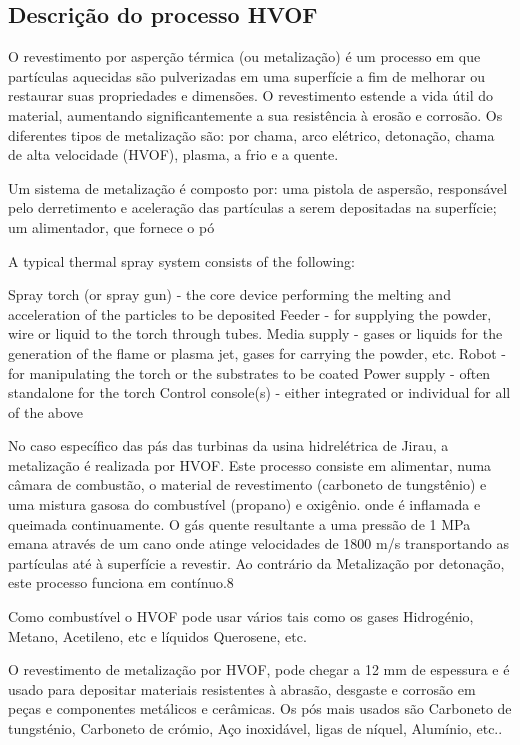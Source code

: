 \subsection{Descrição do processo HVOF}
O revestimento por asperção térmica (ou metalização) é um processo em que
partículas aquecidas são pulverizadas em uma superfície a fim de melhorar ou
restaurar suas propriedades e dimensões. O revestimento estende a vida útil do
material, aumentando significantemente a sua resistência à erosão e corrosão.
Os diferentes tipos de metalização são: por chama, arco elétrico, detonação,
chama de alta velocidade (HVOF), plasma, a frio e a quente.

Um sistema de metalização é composto por: uma pistola de aspersão, responsável
pelo derretimento e aceleração das partículas a serem depositadas na
superfície; um alimentador, que fornece o pó  

A typical thermal
spray system consists of the following:

Spray torch (or spray gun) - the core device performing the melting and
acceleration of the particles to be deposited 
Feeder - for supplying the
powder, wire or liquid to the torch through tubes.
Media supply - gases or liquids for the generation of the flame or plasma jet,
gases for carrying the powder, etc.
Robot - for manipulating the torch or the substrates to be coated
Power supply - often standalone for the torch
Control console(s) - either integrated or individual for all of the above

No caso específico das pás das turbinas da usina hidrelétrica de Jirau, a
metalização é realizada por HVOF. Este processo consiste em alimentar, numa
câmara de combustão, o material de revestimento (carboneto de tungstênio) e uma
mistura gasosa do combustível (propano) e oxigênio. onde é inflamada e queimada
continuamente. O gás quente resultante a uma pressão de 1 MPa emana através de um cano onde atinge velocidades de 1800 m/s transportando as partículas até à superfície a
revestir. Ao contrário da Metalização por detonação, este processo funciona em
contínuo.8

Como combustível o HVOF pode usar vários tais como os gases Hidrogénio, Metano,
Acetileno, etc e líquidos Querosene, etc.

O revestimento de metalização por HVOF, pode chegar a 12 mm de espessura e é
usado para depositar materiais resistentes à abrasão, desgaste e corrosão em
peças e componentes metálicos e cerâmicas. Os pós mais usados são Carboneto de
tungsténio, Carboneto de crómio, Aço inoxidável, ligas de níquel, Alumínio,
etc..


